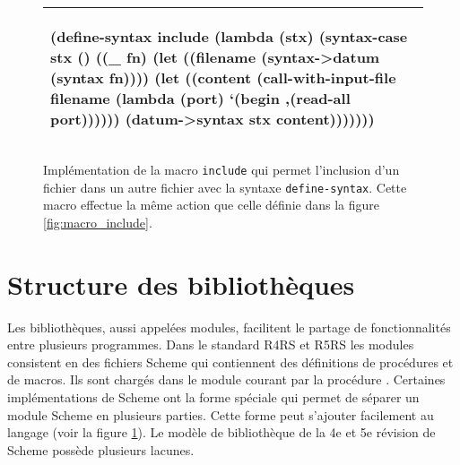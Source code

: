 

\begin{figure}[ht]
\begin{tabular}{|l|}\hline
\begin{mplisting}{0.8}
(define-syntax include
  (lambda (stx)
    (syntax-case stx ()
      ((_ fn)
       (let ((filename (syntax->datum (syntax fn))))
         (let ((content
                 (call-with-input-file
                    filename
                    (lambda (port)
                      `(begin ,(read-all port))))))
           (datum->syntax stx content)))))))
\end{mplisting}\\\hline

\end{tabular}
   \caption{Implémentation de la macro \texttt{include} qui permet l'inclusion
   d'un fichier dans un autre fichier avec la syntaxe \texttt{define-syntax}.
   Cette macro effectue la même action que celle définie dans la figure
   \ref{fig:macro_include}.}

   \label{fig:macro_include_def_syntax}
\end{figure}

\section{Structure des bibliothèques}

Les bibliothèques, aussi appelées modules, facilitent le partage de
fonctionnalités entre plusieurs programmes. Dans le standard
R4RS\cite{Scheme:R4RS} et R5RS\cite{Scheme:R5RS} les modules consistent en des
fichiers Scheme qui contiennent des définitions de procédures et de macros. Ils
sont chargés dans le module courant par la procédure . Certaines
implémentations de Scheme ont la forme spéciale  qui permet de
séparer un module Scheme en plusieurs parties. Cette forme peut s'ajouter
facilement au langage (voir la figure \ref{fig:macro_include_def_syntax}).  Le
modèle de bibliothèque de la 4e et 5e révision de Scheme possède plusieurs
lacunes.

